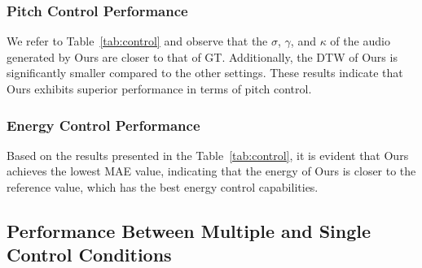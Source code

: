 \documentclass[letterpaper]{article} %
\begin{document}
\subsubsection{Pitch Control Performance} We refer to Table~\ref{tab:control} and observe that the $\sigma$, $\gamma$, and $\kappa$ of the audio generated by Ours are closer to that of GT. Additionally, the DTW of Ours is significantly smaller compared to the other settings. These results indicate that Ours exhibits superior performance in terms of pitch control.

\subsubsection{Energy Control Performance} Based on the results presented in the Table~\ref{tab:control}, it is evident that Ours achieves the lowest MAE value, indicating that the energy of Ours is closer to the reference value, which has the best energy control capabilities.

\subsection{Performance Between Multiple and Single Control Conditions}

\begin{table}[!h]\footnotesize
    \centering
    \caption{The control performance between multiple and single control condition.}
    \label{tab:multi}
\end{table}
\end{document}
